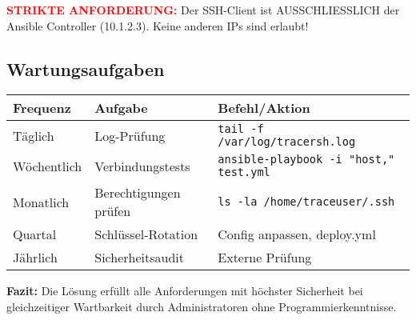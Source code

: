 \documentclass[10pt,a4paper]{article}
\begin{document}
\textcolor{red}{\textbf{STRIKTE ANFORDERUNG:}} Der SSH-Client ist AUSSCHLIESSLICH der Ansible Controller (10.1.2.3). Keine anderen IPs sind erlaubt!

\subsection*{Wartungsaufgaben}
\begin{center}
\begin{tabular}{|l|l|l|}
\hline
\textbf{Frequenz} & \textbf{Aufgabe} & \textbf{Befehl/Aktion} \\
\hline
Täglich & Log-Prüfung & \texttt{tail -f /var/log/tracersh.log} \\
Wöchentlich & Verbindungstests & \texttt{ansible-playbook -i "host," test.yml} \\
Monatlich & Berechtigungen prüfen & \texttt{ls -la /home/traceuser/.ssh} \\
Quartal & Schlüssel-Rotation & Config anpassen, deploy.yml \\
Jährlich & Sicherheitsaudit & Externe Prüfung \\
\hline
\end{tabular}
\end{center}

\textbf{Fazit:} Die Lösung erfüllt alle Anforderungen mit höchster Sicherheit bei gleichzeitiger Wartbarkeit durch Administratoren ohne Programmierkenntnisse.
\end{document}
